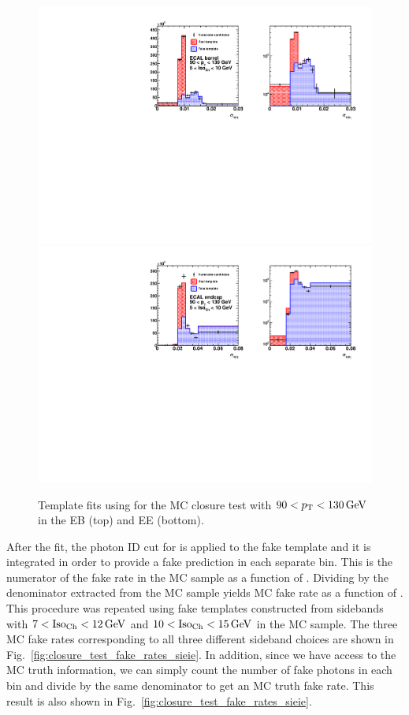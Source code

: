 \begin{figure}[!htbp]
  \centering
  \includegraphics[scale=0.63]{figures/closure_test_h_pt90To130_chIso5To10_EB_Fake_sieie.pdf}
  \includegraphics[scale=0.63]{figures/closure_test_h_pt90To130_chIso5To10_EE_Fake_sieie.pdf}
  \caption{Template fits using \sieie for the MC closure test with $90 < p_{\mathrm{T}} < 130\,\text{Ge\hspace{-.08em}V}$ in the EB (top) and EE (bottom).}
  \label{fig:closure_test_template_fit}
\end{figure}

After the fit, the photon ID cut for \sieie is applied to the fake template and it is integrated in order to provide a fake prediction in each separate \pt bin. This is the numerator of the fake rate in the MC sample as a function of \pt. Dividing by the denominator extracted from the MC sample yields MC fake rate as a function of \pt. This procedure was repeated using fake templates constructed from sidebands with $7 < \text{Iso}_{\text{Ch}} < 12\,\text{Ge\hspace{-.08em}V}$ and $10 < \text{Iso}_{\text{Ch}} < 15\,\text{Ge\hspace{-.08em}V}$ in the MC sample. The three MC fake rates corresponding to all three different sideband choices are shown in Fig.~\ref{fig:closure_test_fake_rates_sieie}. In addition, since we have access to the MC truth information, we can simply count the number of fake photons in each \pt bin and divide by the same denominator to get an MC truth fake rate. This result is also shown in Fig.~\ref{fig:closure_test_fake_rates_sieie}. 

